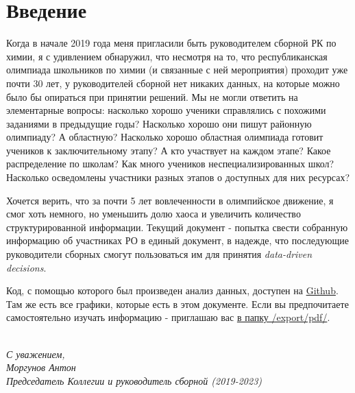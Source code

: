 \section{Введение}

Когда в начале 2019 года меня пригласили быть руководителем сборной РК по химии, я с удивлением обнаружил, что несмотря на то, что республиканская олимпиада школьников по химии (и связанные с ней мероприятия) проходит уже почти 30 лет, у руководителей сборной нет никаких данных, на которые можно было бы опираться при принятии решений. Мы не могли ответить на элементарные вопросы: насколько хорошо ученики справлялись с похожими заданиями в предыдущие годы? Насколько хорошо они пишут районную олимпиаду? А областную? Насколько хорошо областная олимпиада готовит учеников к заключительному этапу? А кто участвует на каждом этапе? Какое распределение по школам? Как много учеников неспециализированных школ? Насколько осведомлены участники разных этапов о доступных для них ресурсах?

Хочется верить, что за почти 5 лет вовлеченности в олимпийское движение, я смог хоть немного, но уменьшить долю хаоса и увеличить количество структурированной информации. Текущий документ - попытка свести собранную информацию об участниках РО в единый документ, в надежде, что последующие руководители сборных смогут пользоваться им для принятия \textit{data-driven decisions}. 

Код, с помощью которого был произведен анализ данных, доступен на \href{https://github.com/anmorgunov/respa-data-analysis}{Github}. Там же есть все графики, которые есть в этом документе. Если вы предпочитаете самостоятельно изучать информацию - приглашаю вас \href{https://github.com/anmorgunov/respa-data-analysis/tree/main/export/pdf}{в папку /export/pdf/}.


\textit{\\
С уважением,\\
Моргунов Антон\\
Председатель Коллегии и руководитель сборной (2019-2023)}